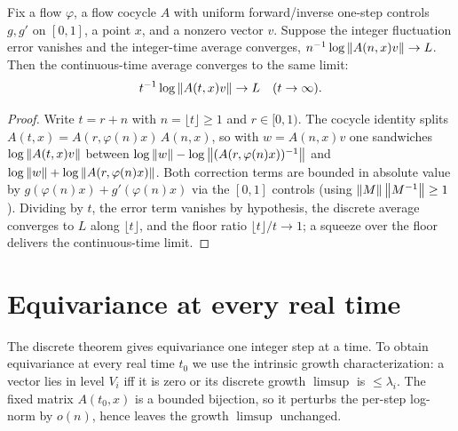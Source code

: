 \begin{theorem}\label{tendsto_log_norm_atTop_of_discrete}
  \leanok
  Fix a flow \( \varphi \), a flow cocycle \( A \) with uniform forward/inverse one-step controls
  \( g, g' \) on \( [0,1] \), a point \( x \), and a nonzero vector \( v \). Suppose the integer
  fluctuation error vanishes and the integer-time average converges,
  \( n^{-1}\log\left\lVert A(n,x)v \right\rVert \to L \). Then the continuous-time average converges to the same
  limit:
  \[ t^{-1}\log\left\lVert A(t,x)v \right\rVert \to L \quad (t \to \infty). \]
\end{theorem}
\begin{proof}\leanok
  Write \( t = r + n \) with \( n = \lfloor t \rfloor \ge 1 \) and \( r \in [0,1) \). The cocycle
  identity splits \( A(t,x) = A(r, \varphi(n)x)\, A(n,x) \), so with \( w = A(n,x)v \) one
  sandwiches \( \log\left\lVert A(t,x)v \right\rVert \) between
  \( \log\left\lVert w \right\rVert - \log\left\lVert (A(r,\varphi(n)x))^{-1} \right\rVert \) and
  \( \log\left\lVert w \right\rVert + \log\left\lVert A(r,\varphi(n)x) \right\rVert \). Both correction terms are bounded in absolute
  value by \( g(\varphi(n)x) + g'(\varphi(n)x) \) via the \( [0,1] \) controls (using
  \( \left\lVert M \right\rVert \left\lVert M^{-1} \right\rVert \ge 1 \)). Dividing by \( t \), the error term vanishes by hypothesis,
  the discrete average converges to \( L \) along \( \lfloor t \rfloor \), and the floor ratio
  \( \lfloor t \rfloor / t \to 1 \); a squeeze over the floor delivers the continuous-time limit.
\end{proof}

\section{Equivariance at every real time}

The discrete theorem gives equivariance one integer step at a time. To obtain equivariance at
every real time \( t_0 \) we use the intrinsic growth characterization: a vector lies in level
\( V_i \) iff it is zero or its discrete growth \( \limsup \) is \( \le \lambda_i \). The fixed
matrix \( A(t_0,x) \) is a bounded bijection, so it perturbs the per-step log-norm by \( o(n) \),
hence leaves the growth \( \limsup \) unchanged.

